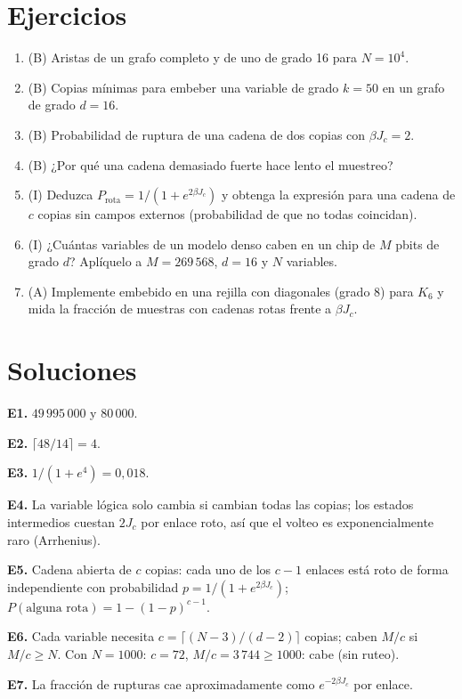 \documentclass[11pt,a4paper]{article}
\begin{document}
\section{Ejercicios}
\begin{enumerate}[label=\textbf{E\arabic*.}]
\item (B) Aristas de un grafo completo y de uno de grado 16 para $N=10^4$.
\item (B) Copias mínimas para embeber una variable de grado $k=50$ en un grafo de grado $d=16$.
\item (B) Probabilidad de ruptura de una cadena de dos copias con $\beta J_c=2$.
\item (B) ¿Por qué una cadena demasiado fuerte hace lento el muestreo?
\item (I) Deduzca $P_{\text{rota}}=1/(1+e^{2\beta J_c})$ y obtenga la expresión para una cadena de $c$ copias sin campos externos (probabilidad de que no todas coincidan).
\item (I) ¿Cuántas variables de un modelo denso caben en un chip de $M$ pbits de grado $d$? Aplíquelo a $M=269\,568$, $d=16$ y $N$ variables.
\item (A) Implemente embebido en una rejilla con diagonales (grado 8) para $K_6$ y mida la fracción de muestras con cadenas rotas frente a $\beta J_c$.
\end{enumerate}
\section{Soluciones}
\begin{solucion}
\textbf{E1.} $49\,995\,000$ y $80\,000$.

\textbf{E2.} $\lceil48/14\rceil=4$.

\textbf{E3.} $1/(1+e^4)=0{,}018$.

\textbf{E4.} La variable lógica solo cambia si cambian todas las copias; los estados intermedios cuestan $2J_c$ por enlace roto, así que el volteo es
exponencialmente raro (Arrhenius).

\textbf{E5.} Cadena abierta de $c$ copias: cada uno de los $c-1$ enlaces está roto de forma independiente con probabilidad $p=1/(1+e^{2\beta J_c})$;
$P(\text{alguna rota})=1-(1-p)^{c-1}$.

\textbf{E6.} Cada variable necesita $c=\lceil(N-3)/(d-2)\rceil$ copias; caben $M/c$ si $M/c\ge N$. Con $N=1000$: $c=72$, $M/c=3\,744\ge1000$: cabe (sin ruteo).

\textbf{E7.} La fracción de rupturas cae aproximadamente como $e^{-2\beta J_c}$ por enlace.
\end{solucion}
\end{document}
